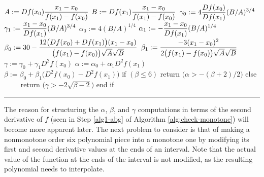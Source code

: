{  $\displaystyle A := Df(x_0){x_1 - x_0 \over f(x_1) - f(x_0)}$ \newline
  $\displaystyle B := Df(x_1) {x_1 - x_0 \over f(x_1) - f(x_0)}$ \newline
     \newline
  $\displaystyle \gamma_0 := 4 {Df(x_0) \over Df(x_1)} (B/A)^{3/4}$ \newline
  $\displaystyle \gamma_1 := {x_1 - x_0 \over Df(x_1)} (B/A)^{3/4}$ \newline
  $\alpha_0 := 4 (B/A)^{1/4}$ \newline
  $\displaystyle \alpha_1 := -{x_1 - x_0 \over Df(x_1)} (B/A)^{1/4}$ \newline 
  $\displaystyle \beta_0 := 30 - {12 \big(Df(x_0) + Df(x_1)\big) (x_1 - x_0) \over \big(f(x_1) - f(x_0)\big) \sqrt{A}\sqrt{B}}$ \newline
  $\displaystyle \beta_1 := {-3 (x_1 - x_0)^2 \over 2 \big(f(x_1) - f(x_0)\big) \sqrt{A} \sqrt{B}} $ \newline
     \newline
  $\gamma := \gamma_0 + \gamma_1 D^2f(x_0)$ \newline
  $\alpha := \alpha_0 + \alpha_1 D^2f(x_1)$ \newline
  $\beta := \beta_0 + \beta_1 \big(D^2f(x_0) - D^2f(x_1)\big)$ \newline
  if $(\beta \leq 6)$ return $\big(\alpha > - (\beta + 2) / 2\big)$ \newline
  else $\qquad$ return $\big(\gamma > -2 \sqrt{\beta - 2}\big)$ \newline
  end if \newline
}
\endnumberedlist
\vskip 2mm
\hrule
\vskip 3mm
\parindent=10pt


The reason for structuring the $\alpha$, $\beta$, and $\gamma$ computations in terms of the second derivative of $f$ (seen in Step \ref{alg1-abg} of Algorithm \ref{alg:check-monotone}) will become more apparent later. The next problem to consider is that of making a nonmonotone order six polynomial piece into a monotone one by modifying its first and second derivative values at the ends of an interval. Note that the actual value of the function at the ends of the interval is not modified, as the resulting polynomial needs to interpolate.



